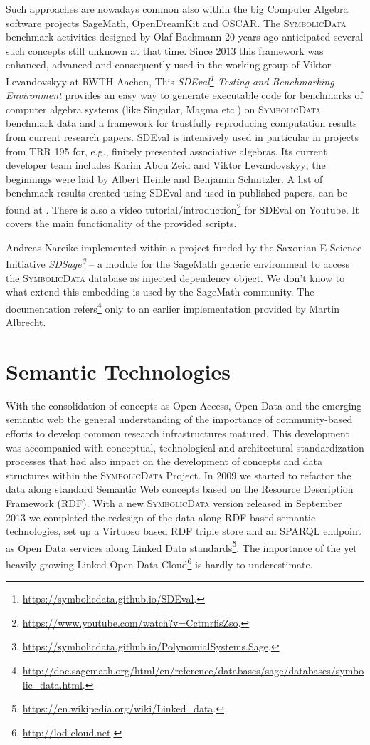 \documentclass[12pt]{article}
\def\SD{\textsc{Sym\-bolic\-Data}}
\begin{document}
Such approaches are nowadays common also within the big Computer Algebra
software projects SageMath, OpenDreamKit and OSCAR. The {\SD} benchmark
activities designed by Olaf Bachmann 20 years ago anticipated several such
concepts still unknown at that time.  Since 2013 this framework was enhanced,
advanced and consequently used in the working group of Viktor Levandovskyy at
RWTH Aachen, This
\emph{SDEval\footnote{\url{https://symbolicdata.github.io/SDEval}.}  Testing
  and Benchmarking Environment} provides an easy way to generate executable
code for benchmarks of computer algebra systems (like Singular, Magma etc.) on
{\SD} benchmark data and a framework for trustfully reproducing computation
results from current research papers.  SDEval is intensively used in particular
in projects from TRR 195 for, e.g., finitely presented associative
algebras. Its current developer team includes Karim Abou Zeid and Viktor
Levandovskyy; the beginnings were laid by Albert Heinle and Benjamin
Schnitzler.  A list of benchmark results created using SDEval and used in
published papers, can be found at \cite{heinle-web}.  There is also a video
tutorial/introduction\footnote{\url{https://www.youtube.com/watch?v=CctmrfisZso}.}
for SDEval on Youtube. It covers the main functionality of the provided
scripts.

Andreas Nareike implemented within a project funded by the Saxonian E-Science
Initiative
\emph{SDSage\footnote{\url{https://symbolicdata.github.io/PolynomialSystems.Sage}.}}
-- a module for the SageMath \cite{sagemath} generic environment to access the
{\SD} database as injected dependency object.  We don't know to what extend
this embedding is used by the SageMath community. The documentation
refers\footnote{\url{http://doc.sagemath.org/html/en/reference/databases/sage/databases/symbolic_data.html}.}
only to an earlier implementation provided by Martin Albrecht.

\section{Semantic Technologies}

With the consolidation of concepts as Open Access, Open Data and the emerging
semantic web the general understanding of the importance of community-based
efforts to develop common research infrastructures matured.  This development
was accompanied with conceptual, technological and architectural
standardization processes that had also impact on the development of concepts
and data structures within the {\SD} Project.  In 2009 we started to refactor
the data along standard Semantic Web concepts based on the Resource Description
Framework (RDF).  With a new {\SD} version released in September 2013 we
completed the redesign of the data along RDF based semantic technologies, set
up a Virtuoso based RDF triple store and an SPARQL endpoint as Open Data
services along Linked Data
standards\footnote{\url{https://en.wikipedia.org/wiki/Linked_data}.}. The
importance of the yet heavily growing Linked Open Data
Cloud\footnote{\url{http://lod-cloud.net}.} is hardly to underestimate.
\end{document}
